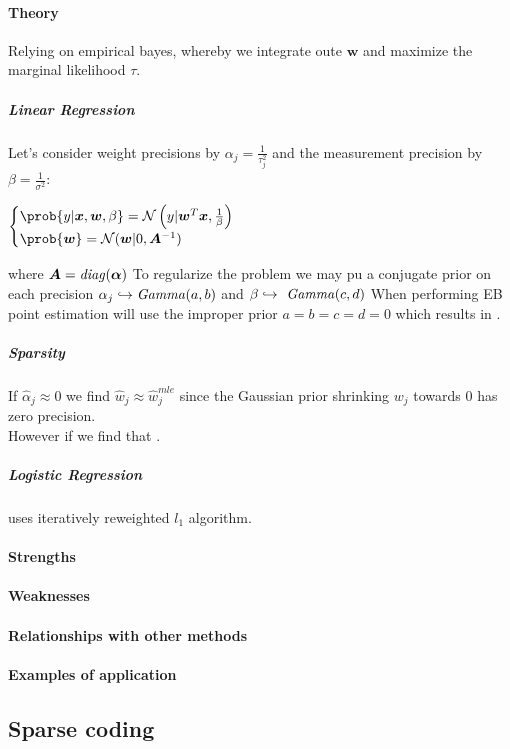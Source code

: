 \paragraph{Theory} 
Relying on empirical bayes, whereby we integrate oute $\bm{w}$ and maximize the 
marginal likelihood $\tau$.
\subparagraph{Linear Regression}
Let's consider weight precisions by $\alpha_{j}=\frac{1}{\tau_{j}^{2}}$ and the 
measurement precision by $\beta=\frac{1}{\sigma^{2}}$:
\begin{center}
    $\begin{cases}
        \prob{y|\bm{x},\bm{w},\beta} = \mathcal{N}\left(y|\bm{w}^{T}\bm{x},\frac{1}{
            \beta}\right) \\
            \prob{\bm{w}} = \mathcal{N}(\bm{w}|0,\bm{A}^{-1})
    \end{cases}$
\end{center}
where $\bm{A}=\text{\emph{diag}}(\bm{\alpha})$
To regularize the problem we may pu a conjugate prior on each precision $\alpha_{j}
\hookrightarrow \text{\emph{Gamma}}(a, b)$ and $\beta \hookrightarrow \text{\emph{
Gamma}}(c, d)$
When performing EB point estimation will use the improper prior $a=b=c=d=0$ which
results in .
\subparagraph{Sparsity}
If $\hat{\alpha}_{j} \approx 0$ we find $\hat{w}_{j}\approx \hat{w}^{mle}_{j}$ since
the Gaussian prior shrinking $w_{j}$ towards 0 has zero precision.\\
However if we find that .
\subparagraph{Logistic Regression}
uses iteratively reweighted $l_{1}$ algorithm.

\paragraph{Strengths}
\paragraph{Weaknesses}
\paragraph{Relationships with other methods}
\paragraph{Examples of application}



\subsection{Sparse coding}

